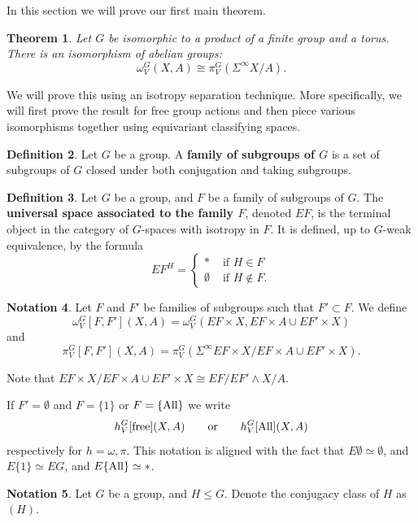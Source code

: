 \documentclass[11pt]{amsart}
\newcommand{\All}{\textup{All}}
\newcommand{\free}{\textup{free}}
\theoremstyle{plain}   %
\newtheorem{thm}{Theorem}[section] %
\theoremstyle{definition}
\newtheorem{df}[thm]{Definition}
\newtheorem{notn}[thm]{Notation}
\theoremstyle{remark}
\numberwithin{equation}{section}
\begin{document}
In this section we will prove our first main theorem.

\begin{thm}
Let $G$ be isomorphic to a product of a finite group and a torus. There is an isomorphism of abelian groups:
\[
\omega_V^G(X,A)\cong \pi_V^G(\Sigma^\infty X/A).
\]
\end{thm}

We will prove this using an isotropy separation technique. More specifically, we will first prove the result for free group actions and then piece various isomorphisms together using equivariant classifying spaces. 

\begin{df}
Let $G$ be a group. A \textbf{family of subgroups of $G$} is a set of subgroups of $G$ closed under both conjugation and taking subgroups.
\end{df}

\begin{df}
Let $G$ be a group, and $F$ be a family of subgroups of $G$. The \textbf{universal space associated to the family $F$}, denoted $EF$, is the terminal object in the category of $G$-spaces with isotropy in $F$. It is defined, up to $G$-weak equivalence, by the formula
\[
EF^H = \begin{cases}
* & \text{ if $H\in F$}\\
\emptyset & \text{ if $H\notin F$}.
\end{cases}
\]
\end{df}

\begin{notn}
Let $F$ and $F'$ be families of subgroups such that $F'\subset F$. We define
\[
\omega_V^G[F,F'](X,A) = \omega_V^G(EF\times X, EF\times A\cup EF'\times X)
\]
and
\[
\pi_V^G[F,F'](X,A) = \pi_V^G(\Sigma^\infty EF\times X/EF\times A\cup EF'\times X).
\]

Note that $EF\times X/EF\times A\cup EF'\times X\cong EF/EF'\wedge X/A$.

If $F'=\emptyset$ and $F=\{1\}$ or $F=\{\All\}$ we write
\[
h_V^G[\free](X,A) \qquad \text{or} \qquad h_V^G[\All](X,A)
\]
respectively for $h=\omega,\pi$. This notation is aligned with the fact that $E\emptyset\simeq \emptyset$, and $E\{1\}\simeq EG$, and $E\{\All\}\simeq *$. 
\end{notn} 

\begin{notn}
Let $G$ be a group, and $H\leq G$. Denote the conjugacy class of $H$ as $(H)$. 
\end{notn}
\end{document}

